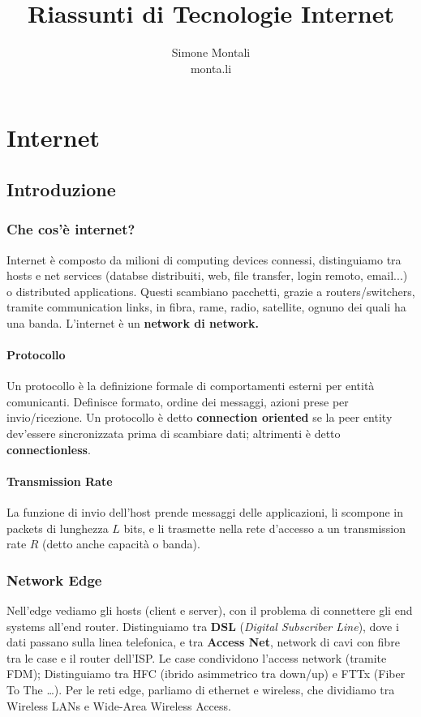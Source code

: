 \documentclass[11pt]{article}
\begin{document}
\author{Simone Montali\\monta.li}
\title{Riassunti di Tecnologie Internet}

\maketitle

\medskip
\section{Internet}
\subsection{Introduzione}
\subsubsection{Che cos'è internet?}
Internet è composto da milioni di computing devices connessi, distinguiamo tra hosts e net services (databse distribuiti, web, file transfer, login remoto, email...) o distributed applications. Questi scambiano pacchetti, grazie a routers/switchers, tramite communication links, in fibra, rame, radio, satellite, ognuno dei quali ha una banda. L'internet è un \textbf{network di network.} 
\paragraph{Protocollo} Un protocollo è la definizione formale di comportamenti esterni per entità comunicanti. Definisce formato, ordine dei messaggi, azioni prese per invio/ricezione. Un protocollo è detto \textbf{connection oriented} se la peer entity dev'essere sincronizzata prima di scambiare dati; altrimenti è detto \textbf{connectionless}. 
\paragraph{Transmission Rate} La funzione di invio dell'host prende messaggi delle applicazioni, li scompone in packets di lunghezza $L$ bits, e li trasmette nella rete d'accesso a un transmission rate $R$ (detto anche capacità o banda).
\subsubsection{Network Edge}
Nell'edge vediamo gli hosts (client e server), con il problema di connettere gli end systems all'end router. Distinguiamo tra \textbf{DSL} (\textit{Digital Subscriber Line}), dove i dati passano sulla linea telefonica, e tra \textbf{Access Net}, network di cavi con fibre tra le case e il router dell'ISP. Le case condividono l'access network (tramite FDM); Distinguiamo tra HFC (ibrido asimmetrico tra down/up) e FTTx (Fiber To The \dots). Per le reti edge, parliamo di ethernet e wireless, che dividiamo tra Wireless LANs e Wide-Area Wireless Access.
\end{document}
